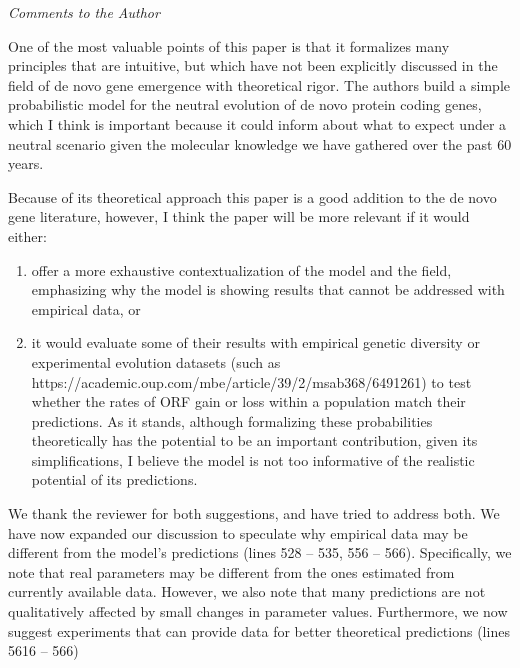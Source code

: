 \documentclass[12pt,a4paper]{article}
\begin{document}
{\itshape Comments to the Author

One of the most valuable points of this paper is that it formalizes many principles that are intuitive, but which have not been explicitly discussed in the field of de novo gene emergence with theoretical rigor. The authors build a simple probabilistic model for the neutral evolution of de novo protein coding genes, which I think is important because it could inform about what to expect under a neutral scenario given the molecular knowledge we have gathered over the past 60 years.

Because of its theoretical approach this paper is a good addition to the de novo gene literature, however, I think the paper will be more relevant if it would either:

\begin{enumerate}
\item offer a more exhaustive contextualization of the model and the field, emphasizing why the model is showing results that cannot be addressed with empirical data, or

\item it would evaluate some of their results with empirical genetic diversity or experimental evolution datasets (such as https://academic.oup.com/mbe/article/39/2/msab368/6491261) to test whether the rates of ORF gain or loss within a population match their predictions. As it stands, although formalizing these probabilities theoretically has the potential to be an important contribution, given its simplifications, I believe the model is not too informative of the realistic potential of its predictions.
\end{enumerate}
}

We thank the reviewer for both suggestions, and have tried to address both. We have now expanded our discussion to speculate why empirical data may be different from the model's predictions (lines 528 -- 535, 556 -- 566). Specifically, we note that real parameters may be different from the ones estimated from currently available data. However, we also note that many predictions are not qualitatively affected by small changes in parameter values. Furthermore, we now suggest experiments that can provide data for better theoretical predictions (lines 5616 -- 566)
\end{document}
